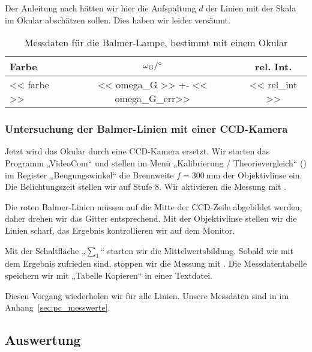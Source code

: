 \begin{small}
    Der Anleitung nach hätten wir hier die Aufspaltung $d$ der Linien
    mit der Skala im Okular abschätzen sollen. Dies haben wir leider versäumt.
\end{small}

\begin{table}[htbp]
    \centering
    \begin{tabular}{lSS}
        Farbe &
        {$\omega_\text G / \si\degree$} &
        {rel. Int.} \\
        \midrule
        << farbe >> & << omega_G >> +- << omega_G_err>> & << rel_int >> \\
    \end{tabular}
    \caption{%
        Messdaten für die Balmer-Lampe, bestimmt mit einem Okular
    }
    \label{tab:messdaten:balmer-okular}
\end{table}

\FloatBarrier
\subsubsection{Untersuchung der Balmer-Linien mit einer CCD-Kamera}

Jetzt wird das Okular durch eine CCD-Kamera ersetzt. Wir starten das Programm
„VideoCom“ und stellen im Menü „Kalibrierung / Theorievergleich“
() im Register „Beugungswinkel“ die Brennweite $f =
\SI{300}{\milli\meter}$ der Objektivlinse ein. Die Belichtungszeit stellen wir
auf Stufe 8. Wir aktivieren die Messung mit .

Die roten Balmer-Linien müssen auf die Mitte der CCD-Zeile abgebildet werden,
daher drehen wir das Gitter entsprechend. Mit der Objektivlinse stellen wir die
Linien scharf, das Ergebnis kontrollieren wir auf dem Monitor.

Mit der Schaltfläche „$\sum_1$“ starten wir die Mittelwertsbildung. Sobald wir
mit dem Ergebnis zufrieden sind, stoppen wir die Messung mit .
Die Messdatentabelle speichern wir mit „Tabelle Kopieren“ in einer Textdatei.

Diesen Vorgang wiederholen wir für alle Linien. Unsere Messdaten sind in
im Anhang~\ref{sec:pc_messwerte}.

\FloatBarrier
\subsection{Auswertung}

